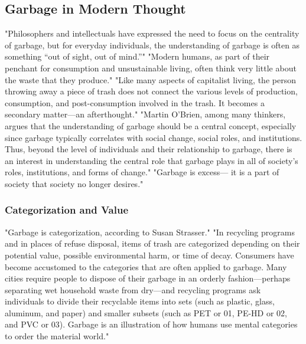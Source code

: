 \documentclass[12pt]{article}
\begin{document}
\subsection{Garbage in Modern Thought}
"Philosophers and intellectuals have expressed the need to focus on the centrality of garbage, but for everyday individuals, the understanding of garbage is often as something “out of sight, out of mind.”" "Modern humans, as part of their penchant for consumption and unsustainable living, often think very little about the waste that they produce." "Like many aspects of capitalist living, the person throwing away a piece of trash does not connect the various levels of production, consumption, and post-consumption involved in the trash. It becomes a secondary matter---an afterthought." "Martin O’Brien, among many thinkers, argues that the understanding of garbage should be a central concept, especially since garbage typically correlates with social change, social roles, and institutions. Thus, beyond the level of individuals and their relationship to garbage, there is an interest in understanding the central role that garbage plays in all of society’s roles, institutions, and forms of change." "Garbage is excess--- it is a part of society that society no longer desires." \cite{lukas2012garbage}

%
\subsubsection{Categorization and Value}
"Garbage is categorization, according to Susan Strasser." "In recycling programs and in places of refuse disposal, items of trash are categorized depending on their potential value, possible environmental harm, or time of decay. Consumers have become accustomed to the categories that are often applied to garbage. Many cities require people to dispose of their garbage in an orderly fashion---perhaps separating wet household waste from dry---and recycling programs ask individuals to divide their recyclable items into sets (such as plastic, glass, aluminum, and paper) and smaller subsets (such as PET or 01, PE-HD or 02, and PVC or 03). Garbage is an illustration of how humans use mental categories to order the material world." \cite{lukas2012garbage}
\end{document}
